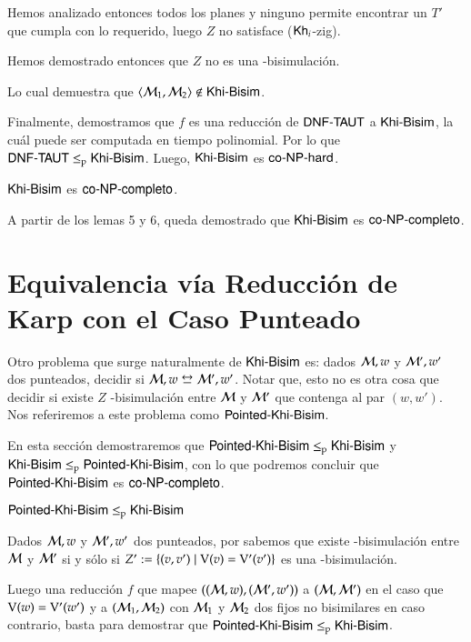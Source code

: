 \begin{demostracion}
\begin{itemize}
    Hemos analizado entonces todos los planes y ninguno permite encontrar un $T'$ que cumpla con lo requerido, 
    luego $Z$ no satisface ($\mathsf{Kh}_i$-zig).

    Hemos demostrado entonces que $Z$ no es una \KHilogic-bisimulación.

    Lo cual demuestra que $\langle \mathcal{M}_1,\mathcal{M}_2 \rangle \not \in \rm\textsf{Khi-Bisim}$.
    \end{itemize}
    Finalmente, demostramos que $f$ es una reducción de $\rm\textsf{DNF-TAUT}$ a $\rm\textsf{Khi-Bisim}$, la cuál puede ser computada en tiempo polinomial.
    Por lo que $\rm\textsf{DNF-TAUT} \leq_p \rm\textsf{Khi-Bisim}$.
    Luego, $\rm\textsf{Khi-Bisim}$ es $\rm\textsf{co-NP-hard}$.
\end{demostracion}


\begin{teorema}\label{thm:general-conp-complete}
    $\rm\textsf{Khi-Bisim}$ es $\rm\textsf{co-NP-completo}$.
\end{teorema}


\begin{demostracion}
    A partir de los lemas 5 y 6, queda demostrado que $\rm\textsf{Khi-Bisim}$ es $\rm\textsf{co-NP-completo}$.
\end{demostracion}


\section{Equivalencia vía Reducción de Karp con el Caso Punteado}

Otro problema que surge naturalmente de $\rm\textsf{Khi-Bisim}$ es: dados $\mathcal{M},w$ y $\mathcal{M}',w'$ dos \ultss punteados, 
decidir si $\modults,w \bisim \modults',w'$. Notar que, esto no es otra cosa que decidir si existe $Z$ \KHilogic-bisimulación entre 
$\mathcal{M}$ y $\mathcal{M}'$ que contenga al par $(w,w')$. Nos referiremos a este problema como $\rm\textsf{Pointed-Khi-Bisim}$.

En esta sección demostraremos que $\rm\textsf{Pointed-Khi-Bisim} \leq_p \rm\textsf{Khi-Bisim}$ y $\rm\textsf{Khi-Bisim} \leq_p \rm\textsf{Pointed-Khi-Bisim}$, con lo que podremos concluir que $\rm\textsf{Pointed-Khi-Bisim}$ 
es $\rm\textsf{co-NP-completo}$.


\begin{lema}\label{lema:pointed-to-general}
    $\rm\textsf{Pointed-Khi-Bisim} \leq_p \rm\textsf{Khi-Bisim}$
\end{lema}

\begin{demostracion}
    Dados $\mathcal{M},w$ y $\mathcal{M}',w'$ dos \ultss punteados, por  sabemos que existe 
    \KHilogic-bisimulación entre $\mathcal{M}$ y $\mathcal{M}'$ si y sólo si $Z' := \{(v,v') \mid \mathrm{V}(v) = \mathrm{V}'(v')\}$ es una \KHilogic-bisimulación. 
    
    Luego una reducción $f$ que mapee $((\mathcal{M},w),(\mathcal{M}',w'))$ a $(\mathcal{M},\mathcal{M}')$ en el caso que $\mathrm{V}(w) = \mathrm{V}'(w')$ 
    y a $(\mathcal{M}_1,\mathcal{M}_2)$ con $\mathcal{M}_1$ y $\mathcal{M}_2$ dos \ultss fijos no bisimilares en caso contrario, basta 
    para demostrar que $\rm\textsf{Pointed-Khi-Bisim} \leq_p \rm\textsf{Khi-Bisim}$.
\end{demostracion}

